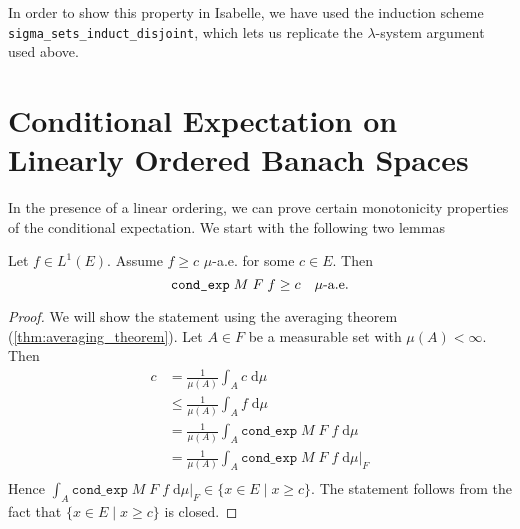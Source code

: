 In order to show this property in Isabelle, we have used the induction scheme \texttt{sigma\_sets\_induct\_disjoint}, which lets us replicate the $\lambda$-system argument used above.

\section{Conditional Expectation on Linearly Ordered Banach Spaces}

In the presence of a linear ordering, we can prove certain monotonicity properties of the conditional expectation. We start with the following two lemmas

\begin{lemma}
	Let $f \in L^1(E)$. Assume $f \ge c$ $\mu$-a.e. for some $c \in E$. Then 
	\[
		\normalfont\texttt{cond\_exp} \; M \; F \; f \ge c \quad \mu\textrm{-a.e.}
	\]
\end{lemma}
\begin{proof}
	We will show the statement using the averaging theorem (\ref{thm:averaging_theorem}). Let $A \in F$ be a measurable set with $\mu(A) < \infty$. Then
	\begin{align*}
		c &= \frac{1}{\mu(A)} \int_A c \; \textrm{d} \mu \\
		&\le \frac{1}{\mu(A)} \int_A f \; \textrm{d} \mu \\
		&= \frac{1}{\mu(A)} \int_A \texttt{cond\_exp} \; M \; F \; f \; \textrm{d} \mu \\
		&= \frac{1}{\mu(A)} \int_A \texttt{cond\_exp} \; M \; F \; f \; \textrm{d} \mu\vert_F \\
	\end{align*}
	Hence $\int_A \texttt{cond\_exp} \; M \; F \; f \; \textrm{d} \mu\vert_F \in \{x \in E \;\vert\; x \ge c \}$. The statement follows from the fact that $\{x \in E \;\vert\; x \ge c \}$ is closed.
\end{proof}

